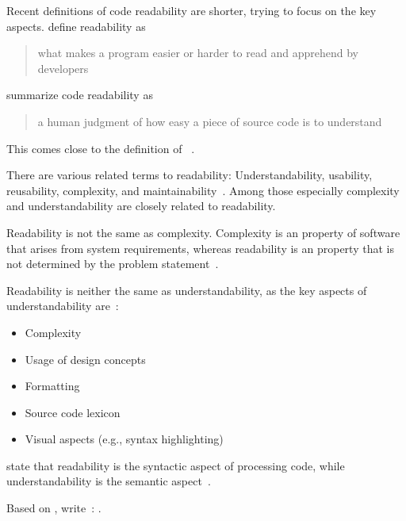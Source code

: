 \documentclass[%
class=scrreprt,
chapterprefix=false,%
open=right,%
twoside=false,%
paper=a4,%
logofile={Logo\_zentral\_farbig\_EN.png},%
thesistype=master,%
UKenglish,%
]{se2thesis}
\theoremstyle{definition}
\begin{document}
	Recent definitions of code readability are shorter, trying to focus on the key aspects. \citeauthor{oliveira2020evaluating} define readability as
	\blockcquote{oliveira2020evaluating}{what makes a program easier or harder to read and apprehend by developers}.
			
	\citeauthor{mi2021effectiveness} summarize code readability as \blockcquote{mi2021effectiveness}{a human judgment of how easy a piece of source code is to understand}. This comes close to the definition of \citeauthor{buse2009learning}~\cite{buse2009learning}.
	
	There are various related terms to readability: Understandability, usability, reusability, complexity, and maintainability~\cite{tashtoush2013impact}. Among those especially complexity and understandability are closely related to readability.
	
	Readability is not the same as complexity. Complexity is an  property of software that arises
	from system requirements, whereas readability is an  property that is not determined by the problem statement~\cite{buse2009learning, brooks1987no}.
	
	Readability is neither the same as understandability, as the key aspects of understandability are~\cite{scalabrino2018comprehensive, martin2009clean, wilson2007beautiful, beck2007implementation}:
	\begin{itemize}
		\item Complexity
		\item Usage of design concepts
		\item Formatting
		\item Source code lexicon
		\item Visual aspects (e.g., syntax highlighting)
	\end{itemize}
	
	\citeauthor{posnett2011simpler} state that readability is the syntactic aspect of processing code, while understandability is the semantic aspect~\cite{posnett2011simpler}.
	
	Based on \citeauthor{posnett2011simpler}, \citeauthor{scalabrino2018comprehensive} write~\cite{scalabrino2018comprehensive}:
	.
	
	
\end{document}
